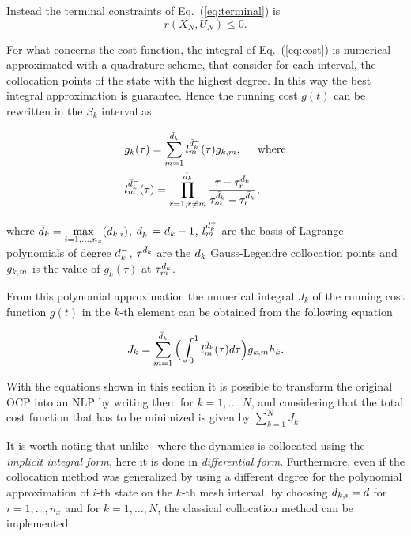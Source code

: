 Instead the terminal constraints of Eq.~(\ref{eq:terminal}) is
\begin{equation}\label{eq:npterminal}
	r(X_N, U_N) \leq 0.
\end{equation}

For what concerns the cost function, the integral of Eq.~(\ref{eq:cost}) is numerical approximated with a quadrature scheme, that consider for each interval, the collocation points of the state with the highest degree. In this way the best integral approximation is guarantee. Hence the running cost $g(t)$ can be rewritten in the $S_k$ interval as

\begin{subequations}
	\begin{align}
	& g_k(\tau) = \sum_{m=1}^{\bar{d}_k} l_{m}^{\bar{d}_{k}^{-}}(\tau)g_{k,m}, \hspace{5mm} \text{where} \label{eq:nlpcost}\\
	&  l_{m}^{\bar{d}_{k}^{-}} (\tau) = \prod_{r=1, r\neq m}^{\bar{d}_k} \dfrac{\tau - \tau^{\bar{d}_{k}}_{r}}{\tau^{\bar{d}_{k}}_{m} - \tau^{\bar{d}_{k}}_{r}}, \label{eq:nlplm}
	\end{align}
\end{subequations}

where $\bar{d}_k = \max\limits_{i= 1, \dots, n_x}(d_{k,i})$, $\bar{d}_k^{-} = \bar{d}_k -1$, $l_{m}^{\bar{d}_{k}^{-}}$ are the basis of Lagrange polynomials of degree $\bar{d}_k^{-}$, $\tau^{\bar{d}_{k}}$ are the $\bar{d}_k$ Gauss-Legendre collocation points and $g_{k,m}$ is the value of $g_k (\tau)$ at $\tau^{\bar{d}_{k}}_{m}$.

From this polynomial approximation the numerical integral $J_k$ of the running cost function $g(t)$ in the $k$-th element can be obtained from the following equation

\begin{equation}\label{eq:nlpcostk}
	J_k = \sum_{m=1}^{\bar{d}_k}\Big(\int_{0}^{1}l_{m}^{\bar{d}_{k}}(\tau)d\tau\Big)g_{k,m} h_{k}.
\end{equation}

With the equations shown in this section it is possible to transform the original OCP into an NLP by writing them for $k = 1, \dots, N$, and considering that the total cost function that has to be minimized is given by $\sum_{k=1}^{N}J_k$.

It is worth noting that unlike~\cite{Patterson:OCAM:2015} where the dynamics is collocated using the \emph{implicit integral form}, here it is done in \emph{differential form}.
Furthermore, even if the collocation method was generalized by using a different degree for the polynomial approximation of $i$-th state on the $k$-th mesh interval, by choosing $d_{k,i} = d$ for $i = 1, \dots, n_x$ and for $k = 1, \dots, N$, the classical collocation method can be implemented.
